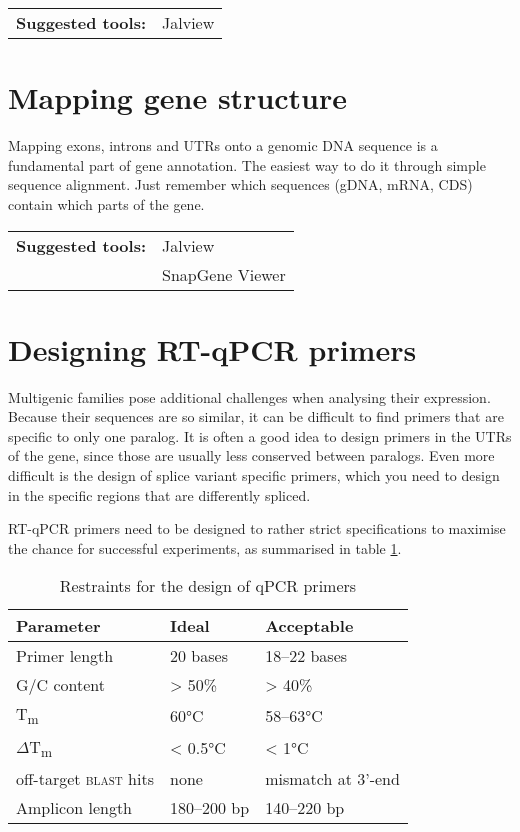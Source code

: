 \documentclass[11pt]{article}
\begin{document}
	\vspace*{\baselineskip}
	
	\noindent\begin{tabular}{@{}ll}
		\textbf{Suggested tools:}	& Jalview \\
	\end{tabular} 
	
	\section{Mapping gene structure\label{sec:str}}
	
	Mapping exons, introns and UTRs onto a genomic DNA sequence is a fundamental part of gene annotation. The easiest way to do it through simple sequence alignment. Just remember which sequences (gDNA, mRNA, CDS) contain which parts of the gene.
	
	\vspace*{\baselineskip}
	
	\noindent\begin{tabular}{@{}ll}
		\textbf{Suggested tools:} & Jalview \\
		& SnapGene Viewer
	\end{tabular} 
	
	\section{Designing RT-qPCR primers\label{sec:qpcr}}
	
	Multigenic families pose additional challenges when analysing their expression. Because their sequences are so similar, it can be difficult to find primers that are specific to only one paralog. It is often a good idea to design primers in the UTRs of the gene, since those are usually less conserved between paralogs. Even more difficult is the design of splice variant specific primers, which you need to design in the specific regions that are differently spliced.
	
	RT-qPCR primers need to be designed to rather strict specifications to maximise the chance for successful experiments, as summarised in table \ref{tab:primers}.
	\begin{table}[h!]
	\caption{Restraints for the design of qPCR primers}
	\label{tab:primers}
	\centering
	\begin{tabular}{@{}lll}
		\toprule
		Parameter & Ideal & Acceptable \\
		\midrule
		Primer length & 20 bases & 18--22 bases \\
		G/C content & > 50\% & > 40\% \\
		T\textsubscript{m}& 60°C & 58--63°C \\
		$\Delta$T\textsubscript{m} & < 0.5°C & < 1°C \\
		off-target \textsc{blast} hits & none & mismatch at 3'-end \\
		Amplicon length & 180--200 bp & 140--220 bp \\
		\bottomrule
	\end{tabular}
	\end{table}
\end{document}
